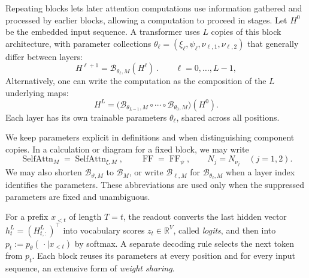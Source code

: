 \documentclass[11pt,twoside]{article}
\newcommand{\R}{\mathbb R}
\theoremstyle{plain}
\theoremstyle{definition}
\theoremstyle{remark}
\begin{document}
Repeating blocks lets later attention computations use information gathered and
processed by earlier blocks, allowing a computation to proceed in stages.
Let $H^0$ be the embedded input sequence. A transformer uses $L$ copies
of this block architecture, with parameter collections
$\theta_\ell=(\xi_\ell,\psi_\ell,\nu_{\ell,1},\nu_{\ell,2})$ that generally differ
between layers:
\begin{equation}
H^{\ell+1}=\mathcal B_{\theta_\ell,M}(H^\ell)\,.
\qquad \ell=0,\ldots,L-1,
\label{eq:block-function}
\end{equation}
Alternatively, one can write the computation as the composition of the $L$ underlying maps:
\begin{equation}
H^L=
\bigl(\mathcal B_{\theta_{L-1},M}\circ\cdots\circ
\mathcal B_{\theta_0,M}\bigr)(H^0).
\label{eq:block-composition}
\end{equation}
Each layer has its own trainable parameters $\theta_\ell$, shared across all positions.

We keep parameters explicit in definitions and when distinguishing component
copies. In a calculation or diagram for a fixed block, we may write
\[
\operatorname{SelfAttn}_M=\operatorname{SelfAttn}_{\xi,M},
\qquad \operatorname{FF}=\operatorname{FF}_\psi,
\qquad N_j=N_{\nu_j}\quad(j=1,2).
\]
We may also shorten $\mathcal B_{\vartheta,M}$ to $\mathcal B_M$, or write
$\mathcal B_{\ell,M}$ for $\mathcal B_{\theta_\ell,M}$ when a layer index
identifies the parameters. These abbreviations are used only when the
suppressed parameters are fixed and unambiguous.

For a prefix $x_{<t}$ of length $T=t$, the readout converts the last hidden vector
$h_t^L=(H^L_{t,:})^\top$ into vocabulary scores $z_t\in\R^V$, called
\emph{logits}, and then into
$p_t:=p_\theta(\,\cdot\mid x_{<t})$ by softmax.
A separate decoding rule selects the next token from $p_t$.
Each block reuses its parameters at every position and for every input
sequence, an extensive form of \emph{weight sharing}.
\end{document}
